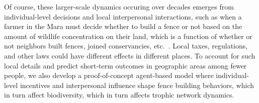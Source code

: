 \documentclass{article}
\theoremstyle{mytheorem}
\theoremstyle{myremark}
\begin{document}
Of course, these larger-scale dynamics occuring over decades emerges from
individual-level decisions and local interpersonal interactions, such as 
when a farmer in the Mara must decide whether to build a fence or not based on
the amount of wildlife concentration on their land, which is a function of whether or
not neighbors built fences, joined conservancies, etc.~\cite{}. Local taxes,
regulations, and other laws could have different effects in different places.
To account for such local details and predict short-term outcomes in geographic areas
among fewer people, we also develop a proof-of-concept agent-based model where
individual-level incentives and interpersonal influence shape fence building
behaviors, which in turn affect biodiversity, which in turn affects trophic network
dynamics. 





\printbibliography
\end{document}
